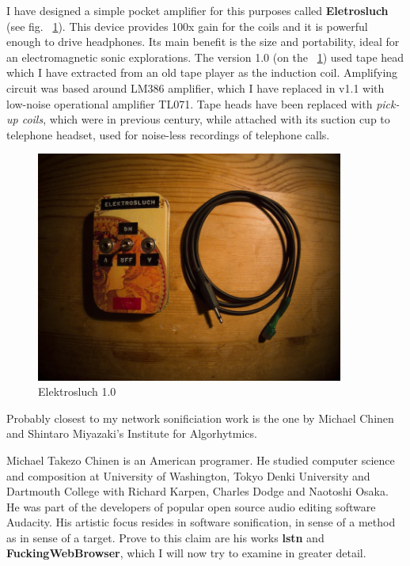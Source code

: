 \documentclass[12pt,a4paper,oneside]{report}
\begin{document}
I have designed a simple pocket amplifier for this purposes called \textbf{Eletrosluch} (see fig.  ~\ref{fig:elektrosluch}). This device provides 100x gain for the coils and it is powerful enough to drive headphones. Its main benefit is the size and portability, ideal for an electromagnetic sonic explorations. The version 1.0 (on the ~\ref{fig:elektrosluch}) used tape head which I have extracted from an old tape player as the induction coil. Amplifying circuit was based around LM386 amplifier, which I have replaced in v1.1 with low-noise operational amplifier TL071. Tape heads have been replaced with \emph{pick-up coils}, which were in previous century, while attached with its suction cup to telephone headset, used for noise-less recordings of telephone calls. 

\begin{figure}  
  \centering
    \includegraphics[width=0.9\textwidth]{img/elektrosluch}
	\caption{Elektrosluch 1.0}
	\label{fig:elektrosluch}
\end{figure}

Probably closest to my network sonificiation work is the one by Michael Chinen  and Shintaro Miyazaki's Institute for Algorhytmics. 

Michael Takezo Chinen is an American programer. He studied computer science and composition at University of Washington, Tokyo Denki University and Dartmouth College with Richard Karpen, Charles Dodge and Naotoshi Osaka. He was part of the developers of popular open source audio editing software Audacity. His artistic focus resides in software sonification, in sense of a method as in sense of a target. Prove to this claim are his works \textbf{lstn} and \textbf{FuckingWebBrowser}, which I will now try to examine in greater detail. \cite{mchinen}
\end{document}
